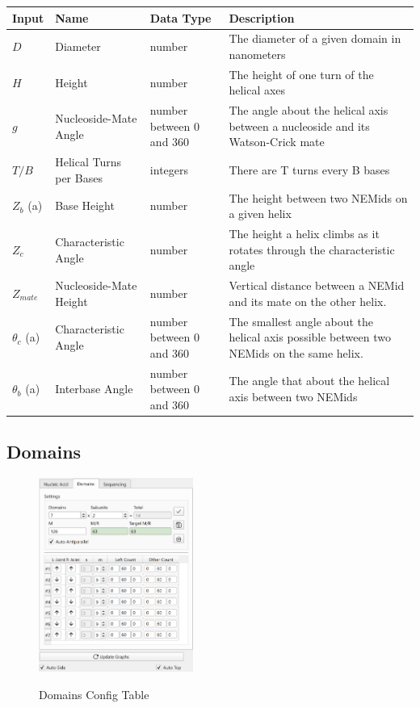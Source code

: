 \documentclass[titlepage]{article}
\begin{document}
	\begin{tabular}{|p{.5in}|p{1in}|p{.7in}|p{1.5in}|}
		\label{tab:setting-descriptions}
		\centering
		Input & Name & Data Type & Description \\
		\hline
		$D$ & Diameter & number & The diameter of a given domain in nanometers \\ \hline
		$H$ & Height & number & The height of one turn of the helical axes \\ \hline
		$g$ & Nucleoside-Mate Angle & number between 0 and 360 & The angle about the helical axis between a nucleoside and its Watson-Crick mate \\ \hline
		$T/B$ & Helical Turns per Bases & integers & There are T turns every B bases \\ \hline
		$Z_b$ (a) & Base Height & number & The height between two NEMids on a given helix \\ \hline
		$Z_c$ & Characteristic Angle & number & The height a helix climbs as it rotates through the characteristic angle \\ \hline
		$Z_{mate}$ & Nucleoside-Mate Height & number & Vertical distance between a NEMid and its mate on the other helix. \\ \hline
		$\theta_{c}$ (a) & Characteristic Angle & number between 0 and 360 & The smallest angle about the helical axis possible between two NEMids on the same helix. \\ \hline
		$\theta_{b}$ (a) & Interbase Angle & number between 0 and 360 & The angle that about the helical axis between two NEMids \\
	\end{tabular}
	
	\subsection{Domains}
	
	\begin{figure}
		\centering
		\caption{Domains Config Table}
		\includegraphics[height=2.5in]{domain-config-table.png}
		\label{fig:domain-config-table}
	\end{figure}
\end{document}
